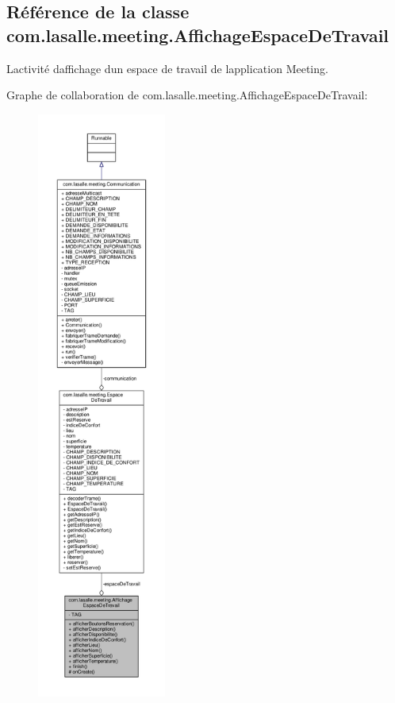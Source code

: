 \hypertarget{classcom_1_1lasalle_1_1meeting_1_1_affichage_espace_de_travail}{}\subsection{Référence de la classe com.\+lasalle.\+meeting.\+Affichage\+Espace\+De\+Travail}
\label{classcom_1_1lasalle_1_1meeting_1_1_affichage_espace_de_travail}


L\textquotesingle{}activité d\textquotesingle{}affichage d\textquotesingle{}un espace de travail de l\textquotesingle{}application Meeting.  




Graphe de collaboration de com.\+lasalle.\+meeting.\+Affichage\+Espace\+De\+Travail\+:\nopagebreak
\begin{figure}[H]
\begin{center}
\leavevmode
\includegraphics[height=550pt]{classcom_1_1lasalle_1_1meeting_1_1_affichage_espace_de_travail__coll__graph}
\end{center}
\end{figure}
